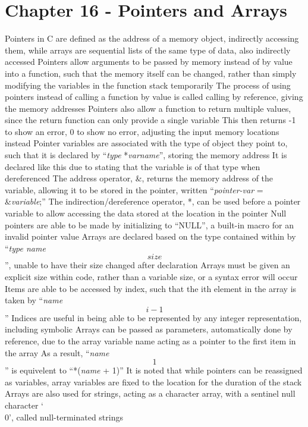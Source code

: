 \documentclass[11 pt, twoside]{article}
\newenvironment{outline*}
{
	\begin{outline}[enumerate]
	}
	{\end{outline}
}
\begin{document}
\section{Chapter 16 - Pointers and Arrays}
\begin{outline*}
\1 Pointers in C are defined as the address of a memory object, indirectly accessing them, while arrays are sequential lists of the same type of data, also indirectly accessed
\1 Pointers allow arguments to be passed by memory instead of by value into a function, such that the memory itself can be changed, rather than simply modifying the variables in the function stack temporarily
\2 The process of using pointers instead of calling a function by value is called calling by reference, giving the memory addresses
\3 Pointers also allow a function to return multiple values, since the return function can only provide a single variable
\3 This then returns -1 to show an error, 0 to show no error, adjusting the input memory locations instead
\2 Pointer variables are associated with the type of object they point to, such that it is declared by ``\textit{type} *\textit{varname}'', storing the memory address
\3 It is declared like this due to stating that the variable is of that type when dereferenced
\2 The address operator, \&, returns the memory address of the variable, allowing it to be stored in the pointer, written ``\textit{pointer-var} = \&\textit{variable};''
\2 The indirection/dereference operator, *, can be used before a pointer variable to allow accessing the data stored at the location in the pointer
\2 Null pointers are able to be made by initializing to ``NULL'', a built-in macro for an invalid pointer value
\1 Arrays are declared based on the type contained within by ``\textit{type name\[size\]}'', unable to have their size changed after declaration
\2 Arrays must be given an explicit size within code, rather than a variable size, or a syntax error will occur
\2 Items are able to be accessed by index, such that the ith element in the array is taken by ``\textit{name\[i-1\]}''
\3 Indices are useful in being able to be represented by any integer representation, including symbolic
\2 Arrays can be passed as parameters, automatically done by reference, due to the array variable name acting as a pointer to the first item in the array
\3 As a result, ``\textit{name\[1\]}'' is equivelent to ``*(\textit{name} + 1)''
\4 It is noted that while pointers can be reassigned as variables, array variables are fixed to the location for the duration of the stack
\2 Arrays are also used for strings, acting as a character array, with a sentinel null character `\\0', called null-terminated strings

\end{outline*}
\end{document}
